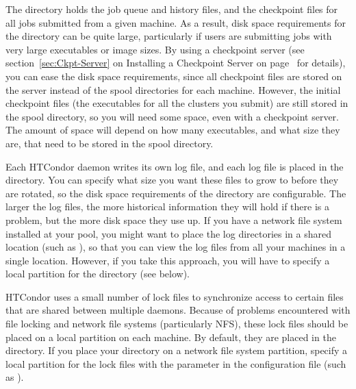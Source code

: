 \begin{description}
\begin{description}
\item[\File{spool}] The  directory holds the job queue
and history files,
and the checkpoint files for all jobs submitted from a given machine.
As a result, disk space requirements for the  directory
can be quite large,
particularly if users are submitting jobs with very large
executables or image sizes.
By using a checkpoint server
(see section~\ref{sec:Ckpt-Server} on Installing a Checkpoint Server on
page~\pageref{sec:Ckpt-Server} for details),
you can ease the disk
space requirements, since all checkpoint files are stored on the
server instead of the spool directories for each machine.  However,
the initial checkpoint files (the executables for all the clusters you
submit) are still stored in the spool directory, so you will need
%
%
some space, even with a checkpoint server. The amount of space will 
depend on how many executables, and what size they are, that need to be stored
in the spool directory.

\item[\File{log}] Each HTCondor daemon writes its own log file,
and each log file is placed
in the  directory.  You can specify what size you want these files
to grow to before they are rotated,
%
%
so the disk space requirements of
the directory are configurable.
The larger the log files, the more
historical information they will hold if there is a problem, but the
more disk space they use up.  If you have a network file system
installed at your pool, you might want to place the log directories in
a shared location (such as ),
so that you can view the log files from all your machines in a single
location.  However, if you take this approach, you will have to
specify a local partition for the  directory (see below).

\item[\File{lock}] HTCondor uses a small number of lock files to synchronize
access to certain files that are shared between multiple daemons.
Because of problems encountered with file locking and network
file systems (particularly NFS), these lock files should be placed on a
local partition on each machine.  By default, they are placed in
the  directory.  If you place your 
directory on a network file system partition,
specify a local partition for the
lock files with the  parameter in the configuration file (such as
).


\end{description}
\end{description}
